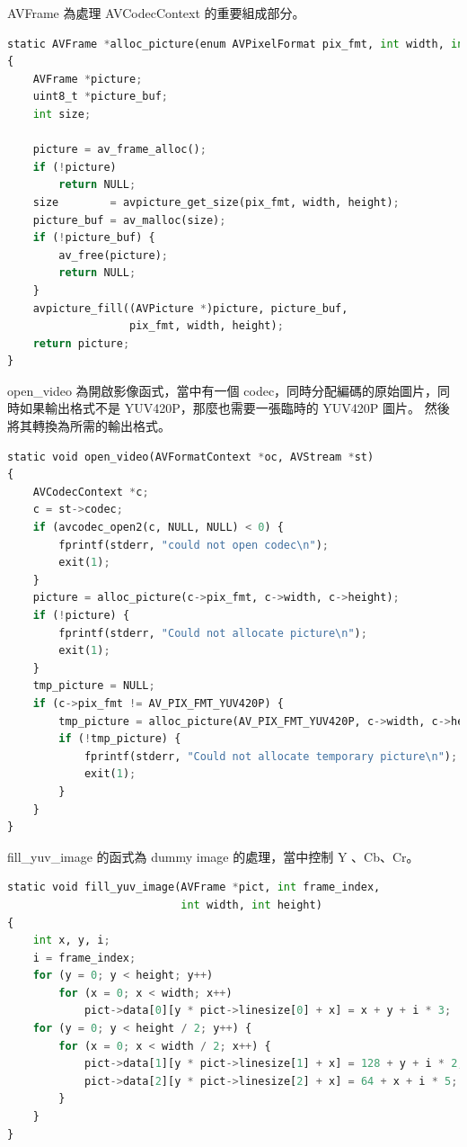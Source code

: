 \documentclass[10pt,UTF8]{ctexart}
\begin{document}
AVFrame 為處理 AVCodecContext 的重要組成部分。

\begin{lstlisting}[language={python}]
static AVFrame *alloc_picture(enum AVPixelFormat pix_fmt, int width, int height)
{
    AVFrame *picture;
    uint8_t *picture_buf;
    int size;

    picture = av_frame_alloc();
    if (!picture)
        return NULL;
    size        = avpicture_get_size(pix_fmt, width, height);
    picture_buf = av_malloc(size);
    if (!picture_buf) {
        av_free(picture);
        return NULL;
    }
    avpicture_fill((AVPicture *)picture, picture_buf,
                   pix_fmt, width, height);
    return picture;
}
\end{lstlisting}

open\_video 為開啟影像函式，當中有一個 codec，同時分配編碼的原始圖片，同時如果輸出格式不是 YUV420P，那麼也需要一張臨時的 YUV420P 圖片。 然後將其轉換為所需的輸出格式。

\begin{lstlisting}[language={python}]
static void open_video(AVFormatContext *oc, AVStream *st)
{
    AVCodecContext *c;
    c = st->codec;
    if (avcodec_open2(c, NULL, NULL) < 0) {
        fprintf(stderr, "could not open codec\n");
        exit(1);
    }
    picture = alloc_picture(c->pix_fmt, c->width, c->height);
    if (!picture) {
        fprintf(stderr, "Could not allocate picture\n");
        exit(1);
    }
    tmp_picture = NULL;
    if (c->pix_fmt != AV_PIX_FMT_YUV420P) {
        tmp_picture = alloc_picture(AV_PIX_FMT_YUV420P, c->width, c->height);
        if (!tmp_picture) {
            fprintf(stderr, "Could not allocate temporary picture\n");
            exit(1);
        }
    }
}
\end{lstlisting}

fill\_yuv\_image 的函式為 dummy image 的處理，當中控制 Y 、Cb、Cr。

\begin{lstlisting}[language={python}]
static void fill_yuv_image(AVFrame *pict, int frame_index,
                           int width, int height)
{
    int x, y, i;
    i = frame_index;
    for (y = 0; y < height; y++)
        for (x = 0; x < width; x++)
            pict->data[0][y * pict->linesize[0] + x] = x + y + i * 3;
    for (y = 0; y < height / 2; y++) {
        for (x = 0; x < width / 2; x++) {
            pict->data[1][y * pict->linesize[1] + x] = 128 + y + i * 2;
            pict->data[2][y * pict->linesize[2] + x] = 64 + x + i * 5;
        }
    }
}

\end{lstlisting}
\end{document}
